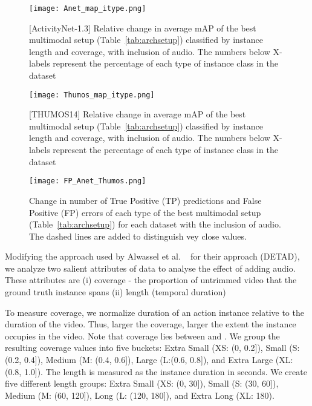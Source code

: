 \documentclass[10pt,twocolumn,letterpaper]{article}
\begin{document}
\begin{figure*}[!t]
\centering
\texttt{[image: Anet\_map\_itype.png]}
\caption{[ActivityNet-1.3] Relative change in average mAP of the best multimodal setup (Table~\ref{tab:archsetup}) classified by instance length and coverage, with inclusion of audio. The numbers below X-labels represent the percentage of each type of instance class in the dataset} 
\label{fig:avnetit}
\end{figure*}

\begin{figure*}[!t]
\centering
\texttt{[image: Thumos\_map\_itype.png]}
\caption{[THUMOS14] Relative change in average mAP of the best multimodal setup (Table~\ref{tab:archsetup}) classified by instance length and coverage, with inclusion of audio. The numbers below X-labels represent the percentage of each type of instance class in the dataset} 
\label{fig:thumosit}
\end{figure*}

\begin{figure*}[!t]
\centering
\texttt{[image: FP\_Anet\_Thumos.png]}
\caption{Change in number of True Positive (TP) predictions and False Positive (FP) errors of each type of the best multimodal setup (Table~\ref{tab:archsetup}) for each dataset with the inclusion of audio. The dashed lines are added to distinguish vey close values.} 
\label{fig:fpat}
\end{figure*}

Modifying the approach used by Alwassel et al. ~\cite{alwassel_2018_detad} for their approach (DETAD), we analyze two salient attributes of data to analyse the effect of adding audio. These attributes are (i) coverage - the proportion of untrimmed video that the ground truth instance spans (ii) length (temporal duration)

To measure coverage, we normalize duration of an action instance relative to the duration of the video. Thus, larger the coverage, larger the extent the instance occupies in the video. Note that coverage lies between  and . We group the resulting coverage values into five buckets: Extra Small (XS: (0, 0.2]), Small (S: (0.2, 0.4]), Medium (M: (0.4, 0.6]), Large (L:(0.6, 0.8]), and Extra Large (XL: (0.8, 1.0]). The length is measured as the instance duration in seconds. We create five different length groups: Extra Small (XS: (0, 30]), Small (S: (30, 60]), Medium (M: (60, 120]), Long (L: (120, 180]), and Extra Long (XL:  180).
\end{document}
